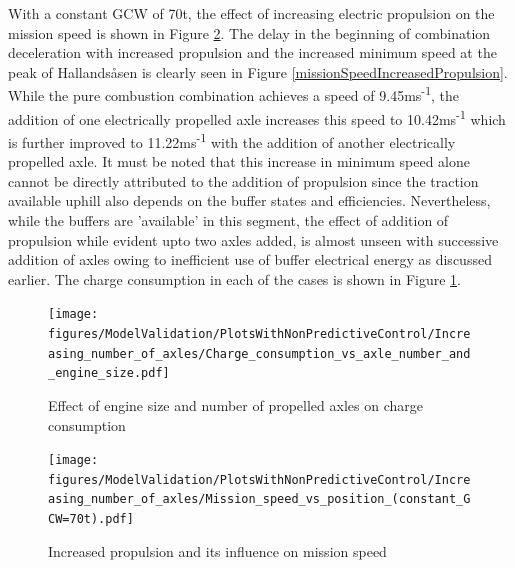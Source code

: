 \documentclass[ExampleMasters.tex]{subfiles}
\begin{document}
With a constant GCW of 70t, the effect of increasing electric propulsion on the mission speed is shown in Figure \ref{globalMissionSpeedIncreasedPropulsion}. The delay in the beginning of combination deceleration with increased propulsion and the increased minimum speed at the peak of Hallands\aa sen is clearly seen in Figure \ref{missionSpeedIncreasedPropulsion}. While the pure combustion combination achieves a speed of 9.45ms\textsuperscript{-1}, the addition of one electrically propelled axle increases this speed to 10.42ms\textsuperscript{-1} which is further improved to 11.22ms\textsuperscript{-1} with the addition of another electrically propelled axle. It must be noted that this increase in minimum speed alone cannot be directly attributed to the addition of propulsion since the traction available uphill also depends on the buffer states and efficiencies. Nevertheless, while the buffers are 'available' in this segment, the effect of addition of propulsion while evident upto two axles added, is almost unseen with successive addition of axles owing to inefficient use of buffer electrical energy as discussed earlier. The charge consumption in each of the cases is shown in Figure \ref{chargeEngineSizeNumberOfAxles}.\\

\begin{figure}[h!]
\centering
\texttt{[image: figures/ModelValidation/PlotsWithNonPredictiveControl/Increasing\_number\_of\_axles/Charge\_consumption\_vs\_axle\_number\_and\_engine\_size.pdf]}
\caption{Effect of engine size and number of propelled axles on charge consumption}
\label{chargeEngineSizeNumberOfAxles}
\end{figure}

\begin{figure}[h!]
\centering
\texttt{[image: figures/ModelValidation/PlotsWithNonPredictiveControl/Increasing\_number\_of\_axles/Mission\_speed\_vs\_position\_(constant\_GCW=70t).pdf]}
\caption{Increased propulsion and its influence on mission speed}
\label{globalMissionSpeedIncreasedPropulsion}
\end{figure}
\end{document}
